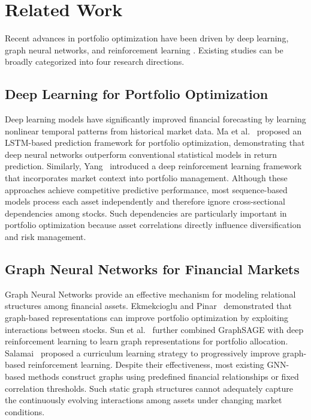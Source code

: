 \documentclass[runningheads]{llncs}
\begin{document}
\section{Related Work}

Recent advances in portfolio optimization have been driven by deep learning, graph neural networks, and reinforcement learning . Existing studies can be broadly categorized into four research directions.

\subsection{Deep Learning for Portfolio Optimization}

Deep learning models have significantly improved financial forecasting by learning nonlinear temporal patterns from historical market data. Ma et al.~\cite{ma2023novel} proposed an LSTM-based prediction framework for portfolio optimization, demonstrating that deep neural networks outperform conventional statistical models in return prediction. Similarly, Yang~\cite{yang2023deep} introduced a deep reinforcement learning framework that incorporates market context into portfolio management. Although these approaches achieve competitive predictive performance, most sequence-based models process each asset independently and therefore ignore cross-sectional dependencies among stocks. Such dependencies are particularly important in portfolio optimization because asset correlations directly influence diversification and risk management.

\subsection{Graph Neural Networks for Financial Markets}

Graph Neural Networks provide an effective mechanism for modeling relational structures among financial assets. Ekmekcioglu and Pinar~\cite{ekmekcioglu2023graph} demonstrated that graph-based representations can improve portfolio optimization by exploiting interactions between stocks. Sun et al.~\cite{sun2024graphsage} further combined GraphSAGE with deep reinforcement learning to learn graph representations for portfolio allocation. Salamai~\cite{salamai2024curriculum} proposed a curriculum learning strategy to progressively improve graph-based reinforcement learning. Despite their effectiveness, most existing GNN-based methods construct graphs using predefined financial relationships or fixed correlation thresholds. Such static graph structures cannot adequately capture the continuously evolving interactions among assets under changing market conditions.
\end{document}
